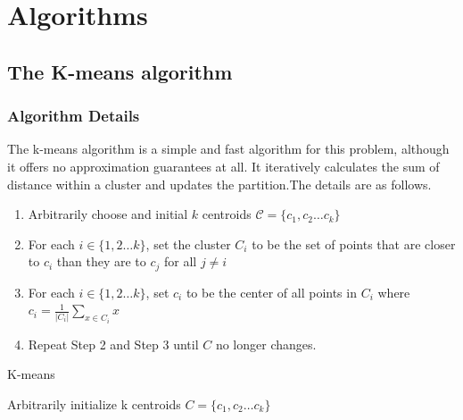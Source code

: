\documentclass[11pt]{article}
\begin{document}
\section{Algorithms}
\subsection{The K-means algorithm}
\subsubsection{Algorithm Details}
The k-means algorithm is a simple and fast algorithm for this problem, although it offers no approximation guarantees at all.
It iteratively calculates the sum of distance within a cluster and updates the partition.The details are as follows.
\begin{enumerate}
  \item Arbitrarily choose and initial $k$ centroids $\mathcal{C} = \{c_1, c_2 \dots c_k\}$
  \item For each $i \in \{1, 2 \dots k\}$, set the cluster $C_i$ to be the set of points that are closer to $c_i$ than they are to $c_j$ for all $j \neq i$
  \item For each $i \in \{1, 2 \dots k\}$, set $c_i$ to be the center of all points in $C_i$ where $c_i = \frac{1}{\left\lvert C_i \right\rvert }\sum_{x \in C_i} x $
  \item Repeat Step 2 and Step 3 until $C$ no longer changes.
\end{enumerate}
\begin{algorithm}
  \caption{K-means}
  \label{k-means}
  \begin{algorithmic}
    \STATE Arbitrarily initialize k centroids $C=\{c_1, c_2 \dots c_k\}$ 
    \REPEAT
      \ENDFOR
      \ENDFOR
      \ENDFOR
      \ENDFOR
  \end{algorithmic}
\end{algorithm}
\end{document}
